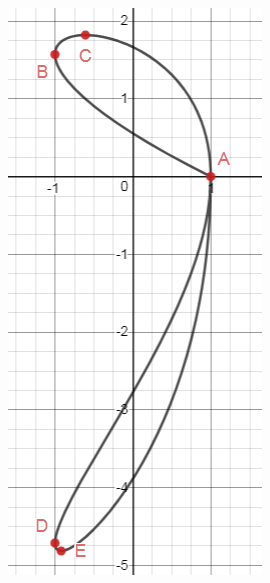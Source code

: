 \begin{figure}
 \centering
 \includegraphics[width=\linewidth]{../problems/Q_043/A_043.png}
\end{figure}
